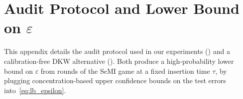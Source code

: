 \documentclass{article}
\theoremstyle{plain}
\theoremstyle{definition}
\theoremstyle{remark}
\newcommand{\EE}{\ensuremath{\mathbb{E}}}
\newcommand{\cZ}{\ensuremath{\mathcal{Z}}}
\newcommand{\cP}{\ensuremath{\mathcal{P}}}
\newcommand{\cA}{\ensuremath{\mathcal{A}}}
\renewcommand{\geq}{\geqslant}
\begin{document}
%
%

\section{Audit Protocol and Lower Bound on $\varepsilon$}
\label{sec:audit_protocol}

This appendix details the audit protocol used in our experiments () and a calibration-free DKW alternative (). Both produce a high-probability lower bound on $\varepsilon$ from rounds of the SeMI game at a fixed insertion time $\tau$, by plugging concentration-based upper confidence bounds on the test errors into~\eqref{eq:lb_epsilon}.
\end{document}
